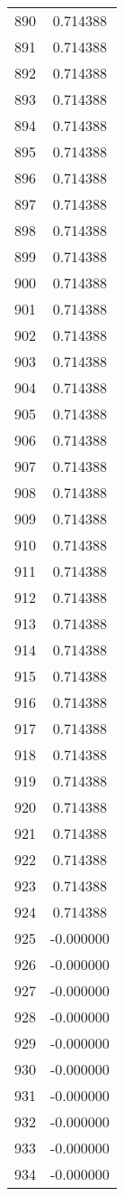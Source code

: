 \documentclass[12pt]{article}
\begin{document}
\begin{longtable}{@{}cc@{}}
890 & 0.714388 \\
891 & 0.714388 \\
892 & 0.714388 \\
893 & 0.714388 \\
894 & 0.714388 \\
895 & 0.714388 \\
896 & 0.714388 \\
897 & 0.714388 \\
898 & 0.714388 \\
899 & 0.714388 \\
900 & 0.714388 \\
901 & 0.714388 \\
902 & 0.714388 \\
903 & 0.714388 \\
904 & 0.714388 \\
905 & 0.714388 \\
906 & 0.714388 \\
907 & 0.714388 \\
908 & 0.714388 \\
909 & 0.714388 \\
910 & 0.714388 \\
911 & 0.714388 \\
912 & 0.714388 \\
913 & 0.714388 \\
914 & 0.714388 \\
915 & 0.714388 \\
916 & 0.714388 \\
917 & 0.714388 \\
918 & 0.714388 \\
919 & 0.714388 \\
920 & 0.714388 \\
921 & 0.714388 \\
922 & 0.714388 \\
923 & 0.714388 \\
924 & 0.714388 \\
925 & -0.000000 \\
926 & -0.000000 \\
927 & -0.000000 \\
928 & -0.000000 \\
929 & -0.000000 \\
930 & -0.000000 \\
931 & -0.000000 \\
932 & -0.000000 \\
933 & -0.000000 \\
934 & -0.000000 \\

\end{longtable}
\end{document}

